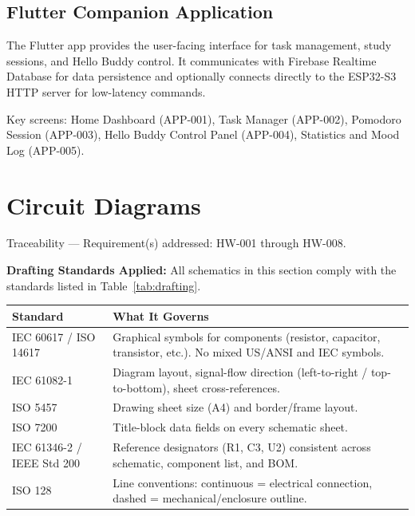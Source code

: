 \documentclass[12pt,a4paper]{article}
\begin{document}
\subsection{Flutter Companion Application}

The Flutter app provides the user-facing interface for task management,
study sessions, and Hello Buddy control. It communicates with Firebase
Realtime Database for data persistence and optionally connects directly
to the ESP32-S3 HTTP server for low-latency commands.

Key screens: Home Dashboard (APP-001), Task Manager (APP-002),
Pomodoro Session (APP-003), Hello Buddy Control Panel (APP-004),
Statistics and Mood Log (APP-005).

\newpage
\section{Circuit Diagrams}

\begin{tracebox}
Traceability --- Requirement(s) addressed: HW-001 through HW-008.
\end{tracebox}

\vspace{0.3cm}

\textbf{Drafting Standards Applied:} All schematics in this section
comply with the standards listed in Table~\ref{tab:drafting}.

\begin{center}
\label{tab:drafting}
\scriptsize
\begin{tabular}{|L{0.30\textwidth}|L{0.58\textwidth}|}
\hline
\textbf{Standard} & \textbf{What It Governs} \\ \hline
IEC 60617 / ISO 14617 & Graphical symbols for components (resistor,
                        capacitor, transistor, etc.). No mixed
                        US/ANSI and IEC symbols. \\ \hline
IEC 61082-1 & Diagram layout, signal-flow direction (left-to-right /
              top-to-bottom), sheet cross-references. \\ \hline
ISO 5457 & Drawing sheet size (A4) and border/frame layout. \\ \hline
ISO 7200 & Title-block data fields on every schematic sheet. \\ \hline
IEC 61346-2 / IEEE Std 200 & Reference designators (R1, C3, U2)
                              consistent across schematic, component
                              list, and BOM. \\ \hline
ISO 128 & Line conventions: continuous = electrical connection,
          dashed = mechanical/enclosure outline. \\ \hline
\end{tabular}
\end{center}
\end{document}
